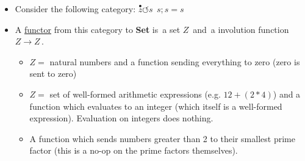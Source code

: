 \begin{itemize}
    \item Consider the following category: $\boxed{\overset{\bullet}{z}\circlearrowleft s\ \ \boxed{s;s = s}}$
    \item A \href{doc/1 math/Seven Sketches in Compositionality/Chapter 3: Databases/3 Functors, natural transformations, and databases/2 Functors/1 Functor}{functor} from this category to \textbf{Set} is \,a set $Z$\, and \,a involution function $Z \rightarrow Z$\,.
          \begin{itemize}
            \item $Z =$ natural numbers and a function sending everything to zero (zero is sent to zero)
            \item $Z =$ set of well-formed arithmetic expressions (e.g. $12+(2*4)$) and a function which evaluates to an integer (which itself is a well-formed expression). Evaluation on integers does nothing.
            \item A function which sends numbers greater than 2 to their smallest prime factor (this is a no-op on the prime factors themselves).
          \end{itemize}
  \end{itemize}
